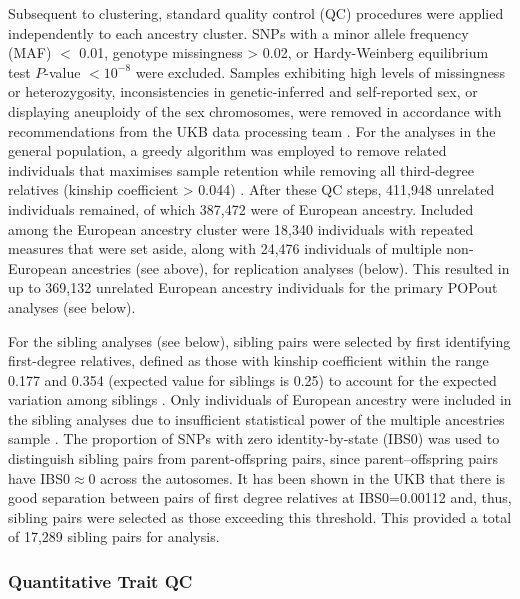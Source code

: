\documentclass[12pt]{zHenriquesLab-StyleBioRxiv}
\begin{document}
{{Subsequent to clustering, standard quality control (QC) procedures
were applied independently to each ancestry cluster. SNPs with a minor
allele frequency (MAF) $<$ 0.01, genotype missingness > 0.02, or
Hardy-Weinberg equilibrium test $P$-value $< 10^{-8}$ were
excluded. Samples exhibiting high levels of missingness or
heterozygosity, inconsistencies in genetic-inferred and self-reported
sex, or displaying aneuploidy of the sex chromosomes, were removed in
accordance with recommendations from the UKB data processing team
\cite{ukb_qc}.  For the analyses in the general population, a greedy
algorithm was employed to remove related individuals that maximises
sample retention while removing all third-degree relatives (kinship
coefficient > 0.044) \cite{erase}.  After these QC steps, 411,948 unrelated    %
individuals remained, of which 387,472 were of European ancestry. Included 
among the European ancestry cluster were 18,340 individuals with repeated 
measures that were set aside, along with 24,476 individuals of multiple 
non-European ancestries (see above), for replication analyses (below). This resulted in up to 369,132 
unrelated European ancestry individuals for the primary POPout analyses (see below). 

For the sibling analyses (see below), sibling pairs were selected by first
identifying first-degree relatives, defined as those with kinship
coefficient within the range 0.177 and 0.354 (expected value for
siblings is 0.25) to account for the expected variation among siblings \cite{sib1}. 
Only individuals of European ancestry were included in the sibling analyses due to 
insufficient statistical power of the multiple ancestries sample \cite{Souaiaia2024}. 
The proportion of SNPs with zero identity-by-state (IBS0) was used to distinguish 
sibling pairs from parent-offspring pairs, since parent–offspring pairs have
IBS0$\approx$0 across the autosomes. It has been shown in the UKB that
there is good separation between pairs of first degree relatives at
IBS0=0.00112 \cite{sib1} and, thus, sibling pairs were selected as
those exceeding this threshold. This provided a total of 17,289 sibling pairs 
for analysis.

\subsubsection*{Quantitative Trait QC} \label{sec:methods:traitQC} 
}}
\end{document}
